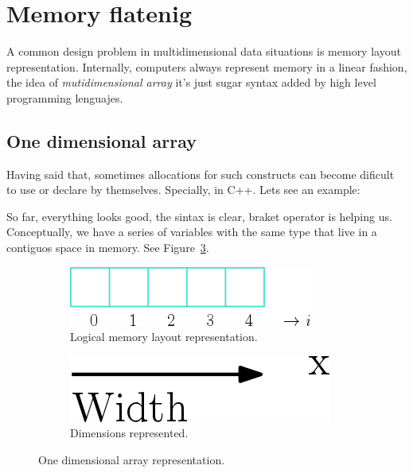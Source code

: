 \section{Memory flatenig}

A common design problem in multidimensional data situations is memory layout representation.
Internally, computers always represent memory in a linear fashion, the idea of \emph{mutidimensional array} it's just sugar syntax added by high level programming lenguajes.

\subsection{One dimensional array}

Having said that, sometimes allocations for such constructs can become dificult to use or declare by themselves.
Specially, in C++.
Lets see an example:


So far, everything looks good, the sintax is clear, braket operator is helping us.
Conceptually, we have a series of variables with the same type that live in a contiguos space in memory.
See Figure~\ref{fig:1D}.

\begin{figure}[htp]
  \centering
  \begin{subfigure}[b]{0.35\textwidth}
    \includegraphics[width=\textwidth]{img/array1D}
    \caption{Logical memory layout representation.}
  \label{fig:1a}
  \end{subfigure}
  \hspace*{4cm}
  \begin{subfigure}[b]{0.25\textwidth}
    \includegraphics[width=\textwidth]{img/arrow1D}
    \caption{Dimensions represented.}
    \label{fig:1b}
  \end{subfigure}
  \caption{One dimensional array representation.}
  \label{fig:1D}
\end{figure}

